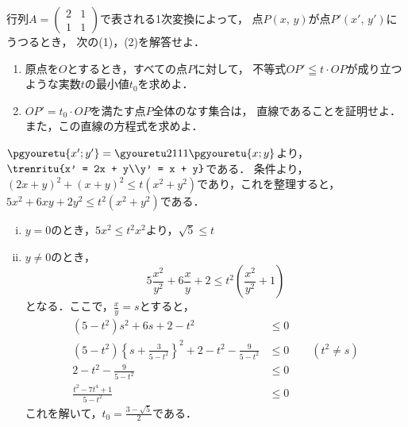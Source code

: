 
\begin{problem}
  行列$A=\begin{pmatrix} 2 & 1 \\ 1 & 1 \end{pmatrix}$で表される1次変換によって，
  点$P(x, \, y)$が点$P'(x', \, y')$にうつるとき，
  次の(1)，(2)を解答せよ．
  \begin{enumerate}
  \item 原点を$O$とするとき，すべての点$P$に対して，
  不等式$OP' \leqq t \cdot OP$が成り立つような実数$t$の最小値$t_0$を求めよ．
  \item $OP'=t_0 \cdot OP$を満たす点$P$全体のなす集合は，
  直線であることを証明せよ．
  また，この直線の方程式を求めよ．
  \end{enumerate}
\end{problem}

$\pgyouretu{x';y'} = \gyouretu2111\pgyouretu{x;y}$より，
$\trenritu{x' = 2x + y\\y' = x + y}$である．
条件より，$(2x+y)^2 + (x+y)^2 \leq t(x^2+y^2)$であり，これを整理すると，
$5x^2 + 6xy + 2y^2 \leq t^2(x^2 + y^2)$である．
\begin{enumerate}[(i)]
  \item $y = 0$のとき，$5x^2 \leq t^2x^2$より，$\sqrt{5} \leq t$
  \item $y \neq 0$のとき，
  \[5\frac{x^2}{y^2} + 6\frac{x}{y} + 2 \leq t^2\left( \frac{x^2}{y^2} + 1 \right)\]
  となる．ここで，$\frac{x}{y} = s$とすると，
  \begin{align*}
    (5-t^2)s^2 + 6s + 2 - t^2 &\leq 0 \\
    (5-t^2)\left\{ s + \frac{3}{5-t^2} \right\}^2 + 2 - t^2 - \frac{9}{5-t^2} &\leq 0 \qquad (t^2 \neq s) \\
    2-t^2 - \frac{9}{5-t^2} &\leq 0 \\
    \frac{t^2-7t^4+1}{5-t^2} &\leq 0
  \end{align*}
  これを解いて，$t_0 = \frac{3-\sqrt5}{2}$である．
\end{enumerate}

